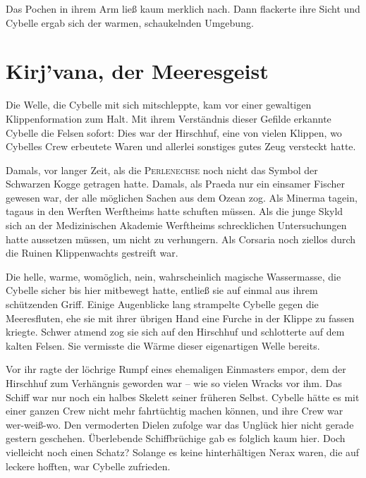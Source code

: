 Das Pochen in ihrem Arm ließ kaum merklich nach. Dann flackerte ihre Sicht und Cybelle ergab sich der warmen, schaukelnden Umgebung.











\newpage
\section{Kirj'vana, der Meeresgeist}

Die Welle, die Cybelle mit sich mitschleppte, kam vor einer gewaltigen Klippenformation zum Halt. Mit ihrem Verständnis dieser Gefilde erkannte Cybelle die Felsen sofort: Dies war der Hirschhuf, eine von vielen Klippen, wo Cybelles Crew erbeutete Waren und allerlei sonstiges gutes Zeug versteckt hatte. 

Damals, vor langer Zeit, als die \textsc{Perlenechse} noch nicht das Symbol der Schwarzen Kogge getragen hatte. Damals, als Praeda nur ein einsamer Fischer gewesen war, der alle möglichen Sachen aus dem Ozean zog. Als Minerma tagein, tagaus in den Werften Werftheims hatte schuften müssen. Als die junge Skyld sich an der Medizinischen Akademie Werftheims schrecklichen Untersuchungen hatte aussetzen müssen, um nicht zu verhungern. Als Corsaria noch ziellos durch die Ruinen Klippenwachts gestreift war.

Die helle, warme, womöglich, nein, wahrscheinlich magische Wassermasse, die Cybelle sicher bis hier mitbewegt hatte, entließ sie auf einmal aus ihrem schützenden Griff. Einige Augenblicke lang strampelte Cybelle gegen die Meeresfluten, ehe sie mit ihrer übrigen Hand eine Furche in der Klippe zu fassen kriegte. Schwer atmend zog sie sich auf den Hirschhuf und schlotterte auf dem kalten Felsen. Sie vermisste die Wärme dieser eigenartigen Welle bereits.

Vor ihr ragte der löchrige Rumpf eines ehemaligen Einmasters empor, dem der Hirschhuf zum Verhängnis geworden war – wie so vielen Wracks vor ihm. Das Schiff war nur noch ein halbes Skelett seiner früheren Selbst. Cybelle hätte es mit einer ganzen Crew nicht mehr fahrtüchtig machen können, und ihre Crew war wer-weiß-wo. Den vermoderten Dielen zufolge war das Unglück hier nicht gerade gestern geschehen. Überlebende Schiffbrüchige gab es folglich kaum hier. Doch vielleicht noch einen Schatz? Solange es keine hinterhältigen Nerax waren, die auf leckere  hofften, war Cybelle zufrieden. 

